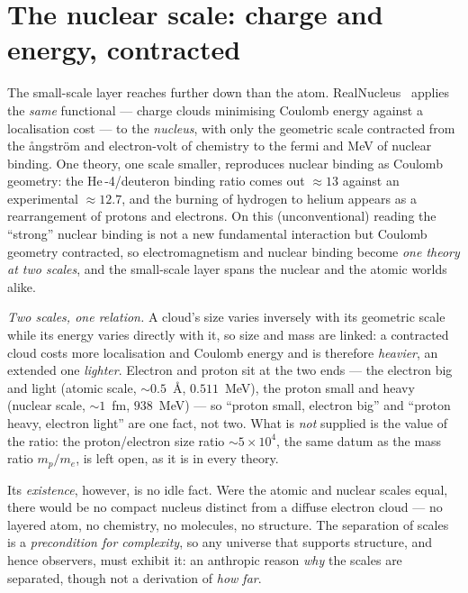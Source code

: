 \documentclass[11pt]{article}
\begin{document}
\section{The nuclear scale: charge and energy, contracted}
The small-scale layer reaches further down than the atom. RealNucleus~\cite{RealNucleus} applies the \emph{same}
functional --- charge clouds minimising Coulomb energy against a localisation cost --- to the \emph{nucleus}, with
only the geometric scale contracted from the \aa{}ngstr\"om and electron-volt of chemistry to the fermi and MeV of
nuclear binding. One theory, one scale smaller, reproduces nuclear binding as Coulomb geometry: the He\,-4/deuteron
binding ratio comes out $\approx 13$ against an experimental $\approx 12.7$, and the burning of hydrogen to helium
appears as a rearrangement of protons and electrons. On this (unconventional) reading the ``strong'' nuclear
binding is not a new fundamental interaction but Coulomb geometry contracted, so electromagnetism and nuclear
binding become \emph{one theory at two scales}, and the small-scale layer spans the nuclear and the atomic worlds
alike.

\emph{Two scales, one relation.} A cloud's size varies inversely with its geometric scale while its energy varies
directly with it, so size and mass are linked: a contracted cloud costs more localisation and Coulomb energy and is
therefore \emph{heavier}, an extended one \emph{lighter}. Electron and proton sit at the two ends --- the electron
big and light (atomic scale, $\sim0.5$~\AA, $0.511$~MeV), the proton small and heavy (nuclear scale, $\sim1$~fm,
$938$~MeV) --- so ``proton small, electron big'' and ``proton heavy, electron light'' are one fact, not two. What
is \emph{not} supplied is the value of the ratio: the proton/electron size ratio $\sim5\times10^4$, the same
datum as the mass ratio $m_p/m_e$, is left open, as it is in every theory.

Its \emph{existence}, however, is no idle fact. Were the atomic and nuclear scales equal, there would be no compact
nucleus distinct from a diffuse electron cloud --- no layered atom, no chemistry, no molecules, no structure. The
separation of scales is a \emph{precondition for complexity}, so any universe that supports structure, and hence
observers, must exhibit it: an anthropic reason \emph{why} the scales are separated, though not a derivation of
\emph{how far}.
\end{document}
